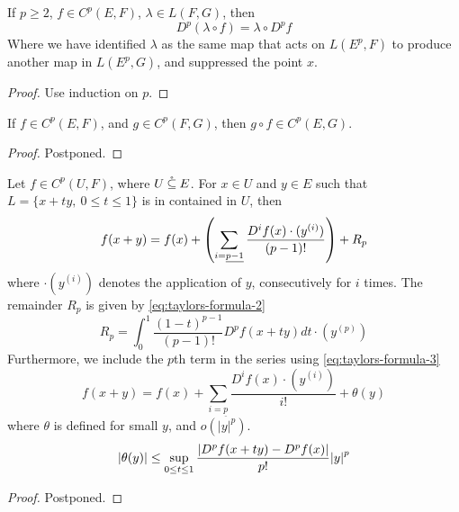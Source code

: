 \documentclass[../main-manifolds.tex]{subfiles}
\begin{document}
\begin{wts}\label{prop:linear-maps-commute-with-p-derivative}
    If $p\geq 2$, $f\in C^p(E,F)$, $\lambda\in L(F,G)$, then
    \[
        D^p(\lambda\circ f) = \lambda\circ D^pf
    \]
    Where we have identified $\lambda$ as the same map that acts on $L(E^p, F)$ to produce another map in $L(E^p, G)$, and suppressed the point $x$.
\end{wts}
\begin{proof}
    Use induction on $p$.
\end{proof}
\begin{wts}\label{prop:Cp-banach-closed-under-composition}
    If $f\in C^p(E,F)$, and $g\in C^p(F,G)$, then $g\circ f\in C^p(E,G)$.
\end{wts}
\begin{proof}
    Postponed.
\end{proof}
\begin{wts}\label{prop:taylors-formula}
    Let $f\in C^p(U, F)$, where $U\:\mathring{\subseteq}\: E$. For $x\in U$ and $y\in E$ such that $L = \{x + ty,\: 0\leq t\leq 1\}$ is in contained in $U$, then 
    \begin{equation}\label{eq:taylors-formula-1}
        f(x+y) = f(x) + \qty(\sum_{i=\underline{p-1}}\dfrac{D^if(x)\cdot (y^{(i)})}{(p-1)!}) + R_p
    \end{equation}
    where $\cdot (y^{(i)})$ denotes the application of $y$, consecutively for $i$ times. The remainder $R_p$ is given by \cref{eq:taylors-formula-2}
    \begin{equation}\label{eq:taylors-formula-2}
        R_p = \int_0^1 \dfrac{(1-t)^{p-1}}{(p-1)!}D^p f(x+ty)dt\cdot (y^{(p)})
    \end{equation}
    Furthermore, we include the $p$th term in the series using \cref{eq:taylors-formula-3}
    \begin{equation}\label{eq:taylors-formula-3}
        f(x+y) = f(x) +\sum_{i=\underline{p}}\dfrac{D^if(x)\cdot (y^{(i)})}{i!} + \theta(y)
    \end{equation}
    where $\theta$ is defined for small $y$, and $o(\vert y\vert^p)$. 
    \begin{equation}\label{eq:taylors-formula-4}
        \abs{\theta(y)}\leq\sup_{0\leq t\leq 1}\dfrac{\abs{D^p f(x+ty) - D^p f(x)}}{p!}\abs{y}^p
    \end{equation}
\end{wts}
\begin{proof}
    Postponed.
\end{proof}
\end{document}
